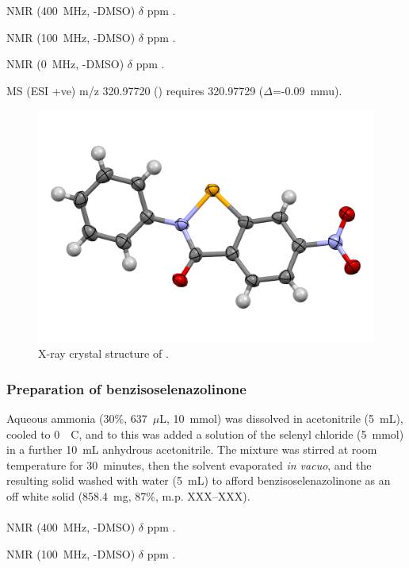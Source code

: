 \begin{refsection}
{\footnotesize
{} NMR (400~MHz, -DMSO) $\delta$ ppm
.

 NMR (100~MHz, -DMSO) $\delta$ ppm
.

 NMR (0~MHz, -DMSO) $\delta$ ppm
.

MS (ESI +ve) m/z 320.97720 ()  requires 320.97729 ($\Delta$=-0.09~mmu).
}

\begin{figure}[ht]
    \centering
    \includegraphics[width=0.8\linewidth]{Figures/ebs-3no2-xray.pdf}
    \caption{X-ray crystal structure of .}
    \label{fig:ebs-3no2-xray}
\end{figure}

\subsubsection{Preparation of benzisoselenazolinone }
Aqueous ammonia (30\%, 637~$\mu$L, 10~mmol) was dissolved in acetonitrile (5~mL), cooled to 0~\degree~C, and to this was added a solution of the selenyl chloride  (5~mmol) in a further 10~mL anhydrous acetonitrile.
The mixture was stirred at room temperature for 30~minutes, then the solvent evaporated \emph{in vacuo}, and the resulting solid washed with water (5~mL) to afford benzisoselenazolinone  as an off white solid (858.4~mg, 87\%, m.p. XXX--XXX).

\footnotesize\paragraph{}

 NMR (400~MHz, -DMSO) $\delta$ ppm
.

 NMR (100~MHz, -DMSO) $\delta$ ppm
.


\end{refsection}
